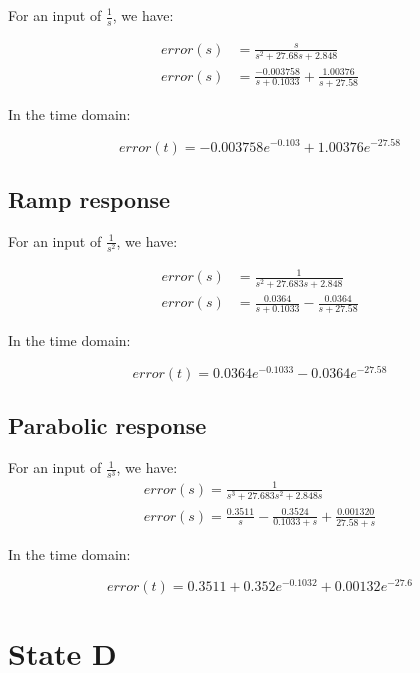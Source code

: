 For an input of $\frac{1}{s}$, we have:

\begin{align}
error(s) &= \frac{s}{s^2 + 27.68 s + 2.848}\\
error(s) &= \frac{-0.003758}{s+0.1033} + \frac{1.00376}{s+27.58}
\end{align}

In the time domain:

\begin{equation}
error(t) =  -0.003758 e^{-0.103} + 1.00376 e^{-27.58}
\end{equation}

\subsection{Ramp response}

For an input of $\frac{1}{s^2}$, we have:

\begin{align}
error(s) &= \frac{1}{s^2 + 27.683 s + 2.848}\\
error(s) &=  \frac{0.0364}{s+0.1033} -\frac{0.0364}{s+27.58}
\end{align}

In the time domain:

\begin{equation}
error(t) =  0.0364e^{-0.1033} - 0.0364e^{-27.58}
\end{equation}


\subsection{Parabolic response}

For an input of $\frac{1}{s^3}$, we have:
\begin{align}
error(s) = \frac{1}{s^3 +27.683 s^2 + 2.848 s}\\
error(s) = \frac{0.3511}{s}-\frac{0.3524}{0.1033+s}
+\frac{0.001320}{27.58+s}
\end{align}

In the time domain:

\begin{equation}
error(t) = 0.3511 + 0.352 e^{-0.1032} + 0.00132 e^{-27.6}
\end{equation}

\clearpage

\section{State D}



